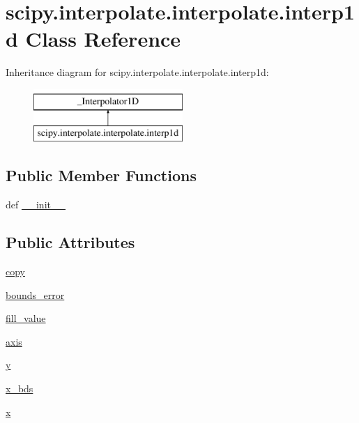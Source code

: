 \hypertarget{classscipy_1_1interpolate_1_1interpolate_1_1interp1d}{}\section{scipy.\+interpolate.\+interpolate.\+interp1d Class Reference}
\label{classscipy_1_1interpolate_1_1interpolate_1_1interp1d}
Inheritance diagram for scipy.\+interpolate.\+interpolate.\+interp1d\+:\begin{figure}[H]
\begin{center}
\leavevmode
\includegraphics[height=2.000000cm]{classscipy_1_1interpolate_1_1interpolate_1_1interp1d}
\end{center}
\end{figure}
\subsection*{Public Member Functions}
\begin{DoxyCompactItemize}
\item 
def \hyperlink{classscipy_1_1interpolate_1_1interpolate_1_1interp1d_aeee0d3a66d646672ba9fd44e10012223}{\+\_\+\+\_\+init\+\_\+\+\_\+}
\end{DoxyCompactItemize}
\subsection*{Public Attributes}
\begin{DoxyCompactItemize}
\item 
\hyperlink{classscipy_1_1interpolate_1_1interpolate_1_1interp1d_aee1d2e2c4a2be5bfe7175015bdfb51ba}{copy}
\item 
\hyperlink{classscipy_1_1interpolate_1_1interpolate_1_1interp1d_aeaa301d92feb5ad41ad2c2c3dd3f5975}{bounds\+\_\+error}
\item 
\hyperlink{classscipy_1_1interpolate_1_1interpolate_1_1interp1d_ac953b4bcbdc3d343dea4e90d51e71939}{fill\+\_\+value}
\item 
\hyperlink{classscipy_1_1interpolate_1_1interpolate_1_1interp1d_ae6e81157d5b76ac03abf60f86fce7a5b}{axis}
\item 
\hyperlink{classscipy_1_1interpolate_1_1interpolate_1_1interp1d_a3c7198a95c4626dcb5184baa37954888}{y}
\item 
\hyperlink{classscipy_1_1interpolate_1_1interpolate_1_1interp1d_afd6b75c3bcd0b72c86e60ca8fd905183}{x\+\_\+bds}
\item 
\hyperlink{classscipy_1_1interpolate_1_1interpolate_1_1interp1d_a6dece428e3c7689e5734d674c51bc9e8}{x}
\end{DoxyCompactItemize}


